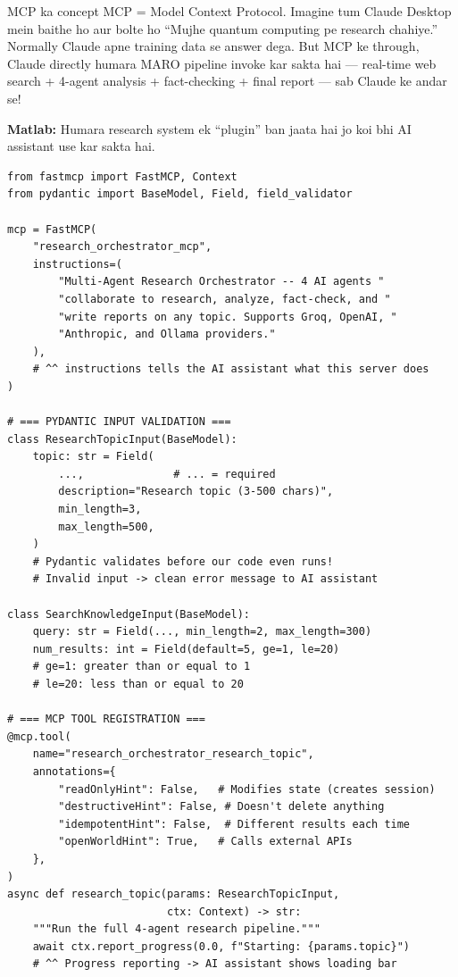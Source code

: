 \documentclass[11pt,a4paper,twoside]{report}
\begin{document}
\begin{storybox}{MCP ka concept}
MCP = Model Context Protocol. Imagine tum Claude Desktop mein baithe ho aur bolte ho ``Mujhe quantum computing pe research chahiye.'' Normally Claude apne training data se answer dega. But MCP ke through, Claude directly humara MARO pipeline invoke kar sakta hai --- real-time web search + 4-agent analysis + fact-checking + final report --- sab Claude ke andar se!

\textbf{Matlab:} Humara research system ek ``plugin'' ban jaata hai jo koi bhi AI assistant use kar sakta hai.
\end{storybox}

\begin{lstlisting}[style=pythonstyle,caption={mcp\_server.py --- Server Setup}]
from fastmcp import FastMCP, Context
from pydantic import BaseModel, Field, field_validator

mcp = FastMCP(
    "research_orchestrator_mcp",
    instructions=(
        "Multi-Agent Research Orchestrator -- 4 AI agents "
        "collaborate to research, analyze, fact-check, and "
        "write reports on any topic. Supports Groq, OpenAI, "
        "Anthropic, and Ollama providers."
    ),
    # ^^ instructions tells the AI assistant what this server does
)

# === PYDANTIC INPUT VALIDATION ===
class ResearchTopicInput(BaseModel):
    topic: str = Field(
        ...,              # ... = required
        description="Research topic (3-500 chars)",
        min_length=3,
        max_length=500,
    )
    # Pydantic validates before our code even runs!
    # Invalid input -> clean error message to AI assistant

class SearchKnowledgeInput(BaseModel):
    query: str = Field(..., min_length=2, max_length=300)
    num_results: int = Field(default=5, ge=1, le=20)
    # ge=1: greater than or equal to 1
    # le=20: less than or equal to 20

# === MCP TOOL REGISTRATION ===
@mcp.tool(
    name="research_orchestrator_research_topic",
    annotations={
        "readOnlyHint": False,   # Modifies state (creates session)
        "destructiveHint": False, # Doesn't delete anything
        "idempotentHint": False,  # Different results each time
        "openWorldHint": True,   # Calls external APIs
    },
)
async def research_topic(params: ResearchTopicInput,
                         ctx: Context) -> str:
    """Run the full 4-agent research pipeline."""
    await ctx.report_progress(0.0, f"Starting: {params.topic}")
    # ^^ Progress reporting -> AI assistant shows loading bar


\end{lstlisting}
\end{document}
